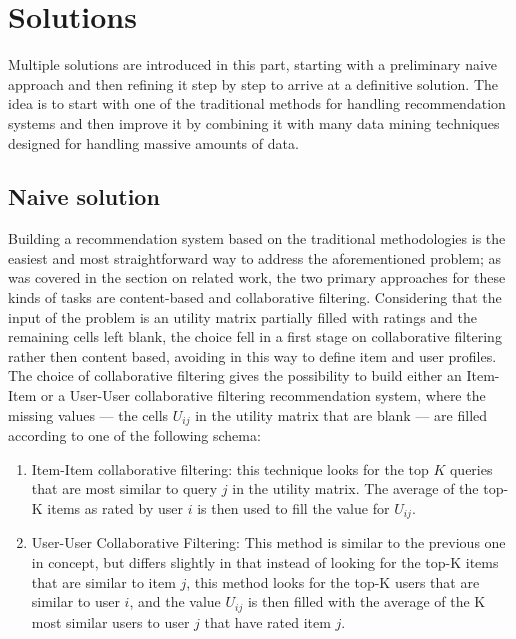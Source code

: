 \section{Solutions}
Multiple solutions are introduced in this part, starting with a preliminary naive approach and then refining it step by step to arrive at a definitive solution. The idea is to start with one of the traditional methods for handling recommendation systems and then improve it by combining it with many data mining techniques designed for handling massive amounts of data. 

\subsection{Naive solution}
\label{naive_solution}
Building a recommendation system based on the traditional methodologies is the easiest and most straightforward way to address the aforementioned problem; as was covered in the section on related work, the two primary approaches for these kinds of tasks are content-based and collaborative filtering. Considering that the input of the problem is an utility matrix partially filled with ratings and the remaining cells left blank, the choice fell in a first stage on collaborative filtering rather then content based, avoiding in this way to define item and user profiles. The choice of collaborative filtering gives the possibility to build either an Item-Item or a User-User collaborative filtering recommendation system, where the missing values — the cells $U_{ij}$ in the utility matrix that are blank — are filled according to one of the following schema:
\begin{enumerate}
    \item Item-Item collaborative filtering: this technique looks for the top $K$ queries that are most similar to query $j$ in the utility matrix. The average of the top-K items as rated by user $i$ is then used to fill the value for $U_{ij}$.
    \item User-User Collaborative Filtering: This method is similar to the previous one in concept, but differs slightly in that instead of looking for the top-K items that are similar to item $j$, this method looks for the top-K users that are similar to user $i$, and the value $U_{ij}$ is then filled with the average of the K most similar users to user $j$ that have rated item $j$. 
\end{enumerate}

